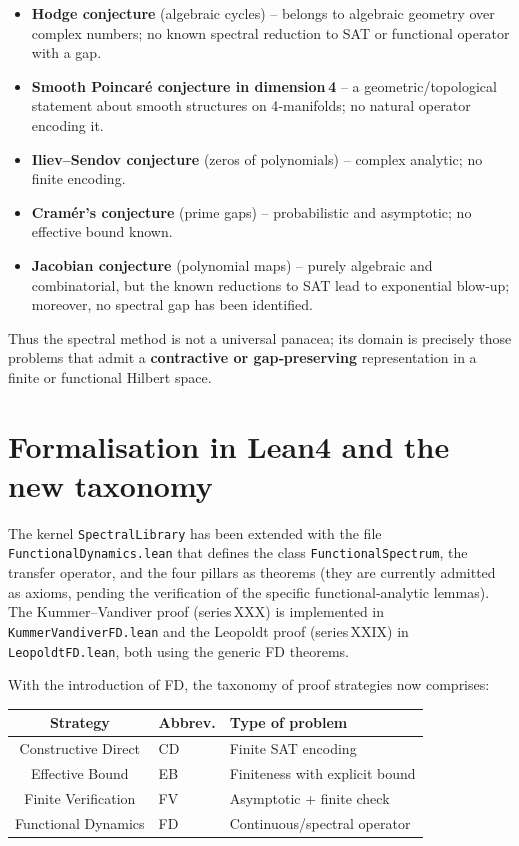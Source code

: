 \documentclass[11pt,a4paper]{article}
\begin{document}
\begin{itemize}
\item \textbf{Hodge conjecture} (algebraic cycles) – belongs to algebraic geometry over complex numbers; no known spectral reduction to SAT or functional operator with a gap.
\item \textbf{Smooth Poincaré conjecture in dimension 4} – a geometric/topological statement about smooth structures on 4‑manifolds; no natural operator encoding it.
\item \textbf{Iliev–Sendov conjecture} (zeros of polynomials) – complex analytic; no finite encoding.
\item \textbf{Cramér’s conjecture} (prime gaps) – probabilistic and asymptotic; no effective bound known.
\item \textbf{Jacobian conjecture} (polynomial maps) – purely algebraic and combinatorial, but the known reductions to SAT lead to exponential blow‑up; moreover, no spectral gap has been identified.
\end{itemize}

Thus the spectral method is not a universal panacea; its domain is precisely those problems that admit a \textbf{contractive or gap‑preserving} representation in a finite or functional Hilbert space.

\section{Formalisation in Lean4 and the new taxonomy}

The kernel \texttt{SpectralLibrary} has been extended with the file \texttt{FunctionalDynamics.lean} that defines the class \texttt{FunctionalSpectrum}, the transfer operator, and the four pillars as theorems (they are currently admitted as axioms, pending the verification of the specific functional‑analytic lemmas). The Kummer–Vandiver proof (series XXX) is implemented in \texttt{KummerVandiverFD.lean} and the Leopoldt proof (series XXIX) in \texttt{LeopoldtFD.lean}, both using the generic FD theorems.

With the introduction of FD, the taxonomy of proof strategies now comprises:

\begin{center}
\begin{tabular}{@{}cll@{}}
\toprule
Strategy & Abbrev. & Type of problem \\
\midrule
Constructive Direct & CD & Finite SAT encoding \\
Effective Bound & EB & Finiteness with explicit bound \\
Finite Verification & FV & Asymptotic + finite check \\
Functional Dynamics & FD & Continuous/spectral operator \\
\bottomrule
\end{tabular}
\end{center}
\end{document}

